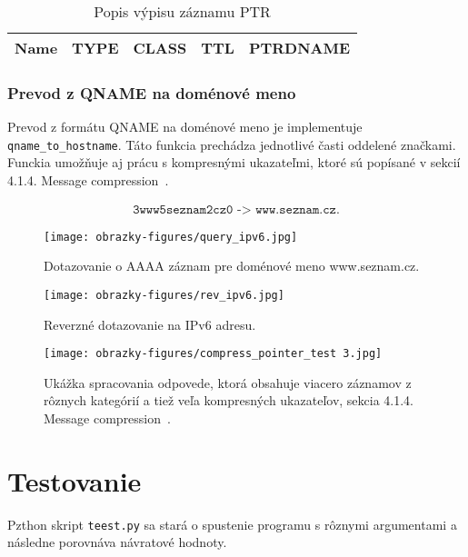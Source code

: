 \begin{table}[!ht]
    \centering
    \begin{tabular}{|c|c|c|c|c|}
        \hline
        Name & TYPE & CLASS & TTL & PTRDNAME \\
        \hline
    \end{tabular}
    \caption{Popis výpisu záznamu PTR}
\end{table}

\subsection{Prevod z QNAME na doménové meno}
Prevod z formátu QNAME na doménové meno je implementuje \texttt{qname\_to\_hostname}. Táto funkcia prechádza jednotlivé časti oddelené značkami. Funckia umožňuje aj prácu s kompresnými ukazateľmi, ktoré sú popísané v sekcií 4.1.4. Message compression~\cite{RFC1035}.

\begin{gather*}
    \texttt{3www5seznam2cz0 -> www.seznam.cz.}
\end{gather*}

\begin{figure}[!ht]
    \centering     %
    \texttt{[image: obrazky-figures/query\_ipv6.jpg]}
    \caption{Dotazovanie o AAAA záznam pre doménové meno www.seznam.cz.}
    \label{fig:query_ipv6}
\end{figure}
\begin{figure}[!ht]
    \centering     %
    \texttt{[image: obrazky-figures/rev\_ipv6.jpg]}
    \caption{Reverzné dotazovanie na IPv6 adresu.}
    \label{fig:rev_ipv6}
\end{figure}
\begin{figure}[!ht]
    \centering     %
    \texttt{[image: obrazky-figures/compress\_pointer\_test 3.jpg]}
    \caption{Ukážka spracovania odpovede, ktorá obsahuje viacero záznamov z rôznych kategórií a tiež veľa kompresných ukazateľov, sekcia 4.1.4. Message compression~\cite{RFC1035}.}
    \label{fig:compress_pointer_test_ipv6}
\end{figure}

\chapter{Testovanie}\label{chap:testovanie}
Pzthon skript \texttt{teest.py} sa stará o spustenie programu s rôznymi argumentami a následne porovnáva návratové hodnoty.

